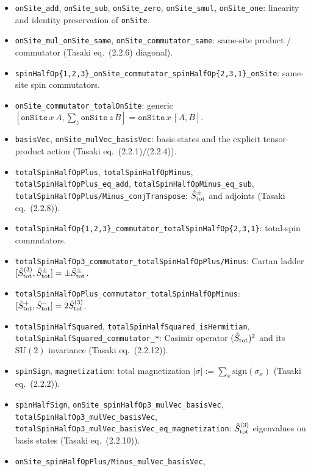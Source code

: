 \documentclass[a4paper,11pt]{article}
\begin{document}
\begin{itemize}
\item \texttt{onSite\_add}, \texttt{onSite\_sub}, \texttt{onSite\_zero},
  \texttt{onSite\_smul}, \texttt{onSite\_one}: linearity and identity
  preservation of \texttt{onSite}.
\item \texttt{onSite\_mul\_onSite\_same},
  \texttt{onSite\_commutator\_same}: same-site product / commutator
  (Tasaki eq.~(2.2.6) diagonal).
\item \texttt{spinHalfOp\{1,2,3\}\_onSite\_commutator\_spinHalfOp\{2,3,1\}\_onSite}:
  same-site spin commutators.
\item \texttt{onSite\_commutator\_totalOnSite}: generic
  $[\texttt{onSite}\,x\,A, \sum_z \texttt{onSite}\,z\,B]
   = \texttt{onSite}\,x\,[A, B]$.
\item \texttt{basisVec}, \texttt{onSite\_mulVec\_basisVec}: basis
  states and the explicit tensor-product action (Tasaki
  eq.~(2.2.1)/(2.2.4)).
\item \texttt{totalSpinHalfOpPlus}, \texttt{totalSpinHalfOpMinus},
  \texttt{totalSpinHalfOpPlus\_eq\_add},
  \texttt{totalSpinHalfOpMinus\_eq\_sub},
  \texttt{totalSpinHalfOpPlus/Minus\_conjTranspose}:
  $\hat S^{\pm}_{\rm tot}$ and adjoints (Tasaki eq.~(2.2.8)).
\item \texttt{totalSpinHalfOp\{1,2,3\}\_commutator\_totalSpinHalfOp\{2,3,1\}}:
  total-spin commutators.
\item \texttt{totalSpinHalfOp3\_commutator\_totalSpinHalfOpPlus/Minus}:
  Cartan ladder $[\hat S_{\rm tot}^{(3)}, \hat S^{\pm}_{\rm tot}]
   = \pm\hat S^{\pm}_{\rm tot}$.
\item \texttt{totalSpinHalfOpPlus\_commutator\_totalSpinHalfOpMinus}:
  $[\hat S^+_{\rm tot}, \hat S^-_{\rm tot}] = 2\hat S^{(3)}_{\rm tot}$.
\item \texttt{totalSpinHalfSquared}, \texttt{totalSpinHalfSquared\_isHermitian},
  \texttt{totalSpinHalfSquared\_commutator\_*}:
  Casimir operator $(\hat S_{\rm tot})^2$ and its $\mathrm{SU}(2)$
  invariance (Tasaki eq.~(2.2.12)).
\item \texttt{spinSign}, \texttt{magnetization}: total magnetization
  $|\sigma| := \sum_x \mathrm{sign}(\sigma_x)$ (Tasaki eq.~(2.2.2)).
\item \texttt{spinHalfSign}, \texttt{onSite\_spinHalfOp3\_mulVec\_basisVec},
  \texttt{totalSpinHalfOp3\_mulVec\_basisVec},
  \texttt{totalSpinHalfOp3\_mulVec\_basisVec\_eq\_magnetization}:
  $\hat S^{(3)}_{\rm tot}$ eigenvalues on basis states (Tasaki
  eq.~(2.2.10)).
\item \texttt{onSite\_spinHalfOpPlus/Minus\_mulVec\_basisVec},

\end{itemize}
\end{document}
